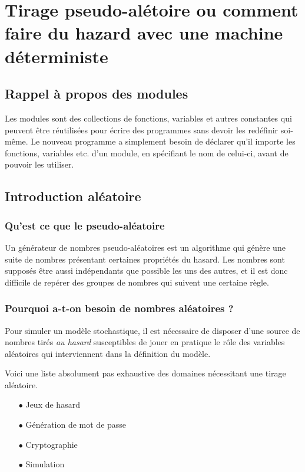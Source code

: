 \section{Tirage pseudo-alétoire ou comment faire du hazard avec une machine déterministe}


\subsection{Rappel à propos des modules}


Les modules sont des collections de fonctions, variables et autres constantes qui
peuvent être réutilisées pour écrire des programmes sans devoir les redéfinir soi-
même. Le nouveau programme a simplement besoin de déclarer qu’il importe
les fonctions, variables etc. d’un module, en spécifiant le nom de celui-ci, avant
de pouvoir les utiliser.

\subsection{Introduction aléatoire}

\subsubsection{Qu'est ce que le pseudo-aléatoire}


Un générateur de nombres pseudo-aléatoires est un algorithme qui génère une suite de nombres
présentant certaines propriétés du hasard.
Les nombres sont supposés être aussi indépendants que possible les uns des autres, et il est donc
difficile de repérer des groupes de nombres qui suivent une certaine règle.


\subsubsection{Pourquoi a-t-on besoin de nombres aléatoires ?}

Pour simuler un modèle stochastique, il est nécessaire de disposer d’une source
de nombres tirés \textit{au hasard} susceptibles de jouer en pratique le rôle
des variables aléatoires qui interviennent dans la définition du modèle.

Voici une liste absolument pas exhaustive des domaines nécessitant une tirage aléatoire.

\begin{itemize}
\item[$\bullet$] Jeux de hasard
\item[$\bullet$] Génération de mot de passe
\item[$\bullet$] Cryptographie
\item[$\bullet$] Simulation
\end{itemize}


